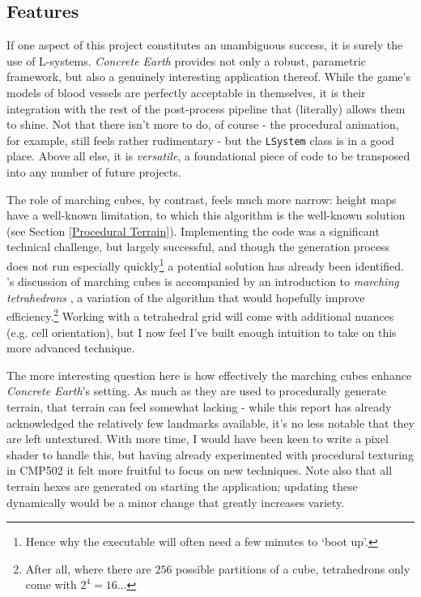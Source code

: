 \documentclass[a4paper, 11pt]{article}
\begin{document}
\begin{flushleft}
\subsection{Features}

If one aspect of this project constitutes an unambiguous success, it is surely the use of L-systems. \textit{Concrete Earth} provides not only a robust, parametric framework, but also a genuinely interesting application thereof. While the game's models of blood vessels are perfectly acceptable in themselves, it is their integration with the rest of the post-process pipeline that (literally) allows them to shine. Not that there isn't more to do, of course - the procedural animation, for example, still feels rather rudimentary - but the \texttt{LSystem} class is in a good place. Above all else, it is \textit{versatile}, a foundational piece of code to be transposed into any number of future projects.

\vspace{5pt}\noindent
The role of marching cubes, by contrast, feels much more narrow: height maps have a well-known limitation, to which this algorithm is the well-known solution (see Section \ref{Procedural Terrain}). Implementing the code was a significant technical challenge, but largely successful, and though the generation process does not run especially quickly\footnote{Hence why the executable will often need a few minutes to `boot up'.} a potential solution has already been identified. \citeauthor{bourkeMarchingTetrahedrons}'s discussion of marching cubes is accompanied by an introduction to \textit{marching tetrahedrons} \citeyearpar{bourkeMarchingTetrahedrons}, a variation of the algorithm that would hopefully improve efficiency.\footnote{After all, where there are $256$ possible partitions of a cube, tetrahedrons only come with $2^4 = 16$...} Working with a tetrahedral grid will come with additional nuances (e.g. cell orientation), but I now feel I've built enough intuition to take on this more advanced technique. %

\vspace{5pt}\noindent
The more interesting question here is how effectively the marching cubes enhance \textit{Concrete Earth}'s setting. As much as they are used to procedurally generate terrain, that terrain can feel somewhat lacking - while this report has already acknowledged the relatively few landmarks available, it's no less notable that they are left untextured. With more time, I would have been keen to write a pixel shader to handle this, but having already experimented with procedural texturing in CMP502 it felt more fruitful to focus on new techniques. Note also that all terrain hexes are generated on starting the application; updating these dynamically would be a minor change that greatly increases variety.


\end{flushleft}
\end{document}
